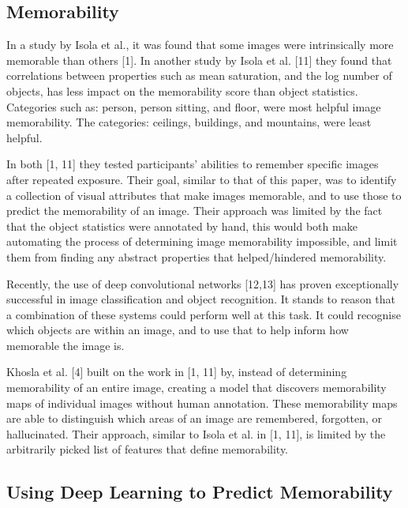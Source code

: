 \documentclass[11pt]{article}
\begin{document}

\subsection{Memorability}

In a study by Isola et al., it was found that some images were intrinsically more memorable than others [1]. In another study by Isola et al. [11] they found that correlations between properties such as mean saturation, and the log number of objects, has less impact on the memorability score than object statistics. Categories such as: person, person sitting, and floor, were most helpful image memorability. The categories: ceilings, buildings, and mountains, were least helpful. 

In both [1, 11] they tested participants' abilities to remember specific images after repeated exposure. Their goal, similar to that of this paper, was to identify a collection of visual attributes that make images memorable, and to use those to predict the memorability of an image. Their approach was limited by the fact that the object statistics were annotated by hand, this would both make automating the process of determining image memorability impossible, and limit them from finding any abstract properties that helped/hindered memorability.

Recently, the use of deep convolutional networks [12,13] has proven exceptionally successful in image classification and object recognition. It stands to reason that a combination of these systems could perform well at this task. It could recognise which objects are within an image, and to use that to help inform how memorable the image is.

Khosla et al. [4] built on the work in [1, 11] by, instead of determining memorability of an entire image, creating a model that discovers memorability maps of individual images without human annotation. These memorability maps are able to distinguish which areas of an image are remembered, forgotten, or hallucinated. Their approach, similar to Isola et al. in [1, 11], is limited by the arbitrarily picked list of features that define memorability.

\subsection{Using Deep Learning to Predict Memorability}
\end{document}
